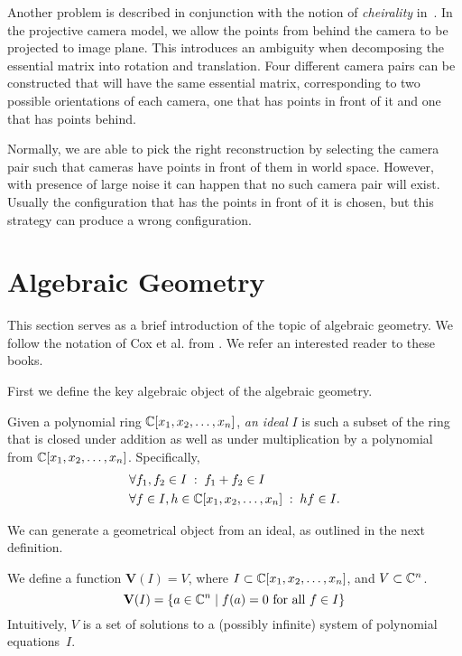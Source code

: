 Another problem is described in conjunction with the notion of \textit{cheirality} in~\cite{Cheirality}. In the projective camera model, we allow the points from behind the camera to be projected to image plane. This introduces an ambiguity when decomposing the essential matrix into rotation and translation. Four different camera pairs can be constructed that will have the same essential matrix, corresponding to two possible orientations of each camera, one that has points in front of it and one that has points behind.

Normally, we are able to pick the right reconstruction by selecting the camera pair such that cameras have points in front of them in world space. However, with presence of large noise it can happen that no such camera pair will exist. Usually the configuration that has the points in front of it is chosen, but this strategy can produce a wrong configuration. 



\section{Algebraic Geometry}

This section serves as a brief introduction of the topic of algebraic geometry. We follow the notation of Cox et al. from \cite{Cox1}\cite{Cox2}. We refer an interested reader to these books. 

First we define the key algebraic object of the algebraic geometry.

\begin{defn}
Given a polynomial ring $\mathbb{C}[x_1,x_2, \dots, x_n]$, \textit{an ideal} $I$ is such a subset of the ring that is closed under addition as well as under multiplication by a polynomial from $ \mathbb{C}[x_1,x_2, \dots, x_n]$. Specifically,
\begin{align*}
  & \forall f_1,f_2 \in I \; : \;  f_1+f_2 \in I \\
  & \forall f \in I, h \in  \mathbb{C}[x_1,x_2, \dots, x_n] \; : \; h f \in I .  
\end{align*}
\end{defn}
We can generate a geometrical object from an ideal, as outlined in the next definition.

\begin{defn}
We define a function $\textbf{V}(I)=V$, where $I \subset \mathbb{C}[x_1,x_2, \dots, x_n]$, and $V \subset \mathbb{C}^n$. \[\textbf{V}(I)=\{ a \in \mathbb{C}^n \; | \; f(a) = 0 \text{ for all } f \in I \} \] Intuitively, $V$ is a set of solutions to a (possibly infinite) system of polynomial equations~$I$.
\end{defn}

